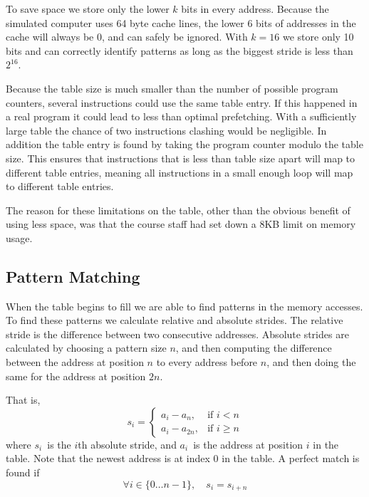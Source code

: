 To save space we store only the lower $k$ bits in every address. Because the
simulated computer uses 64 byte cache lines, the lower 6 bits of addresses in
the cache will always be 0, and can safely be ignored. With $k=16$ we store
only 10 bits and can correctly identify patterns as long as the biggest stride
is less than $2^{16}$.

Because the table size is much smaller than the number of possible program
counters, several instructions could use the same table entry. If this happened
in a real program it could lead to less than optimal prefetching. With a
sufficiently large table the chance of two instructions clashing would be
negligible. In addition the table entry is found by taking the program counter
modulo the table size. This ensures that instructions that is less than table
size apart will map to different table entries, meaning all instructions in a
small enough loop will map to different table entries.

The reason for these limitations on the table, other than the obvious benefit
of using less space, was that the course staff had set down a 8KB limit on
memory usage.

\subsection{Pattern Matching}

When the table begins to fill we are able to find patterns in the memory accesses.
To find these patterns we calculate relative and absolute strides.
The relative stride is the difference between two consecutive
addresses. Absolute strides are calculated by choosing a pattern size $n$,
and then computing the difference between the address at position
$n$ to every address before $n$, and then doing the same for the address
at position $2n$.

That is,
\[
	s_i = \begin{cases}
		a_i - a_n,    & \text{if } i  < n \\%
		a_i - a_{2n}, & \text{if } i \geq n %
	\end{cases}
\]
where $s_i$~is the $i$th absolute stride, and $a_i$~is the address at position
$i$ in the table. Note that the newest address is at index 0 in the table. A
perfect match is found if
\begin{equation}
\label{eq:match}
\forall i \in \{0 \dots n - 1\}, \quad s_i = s_{i + n}
\end{equation}

